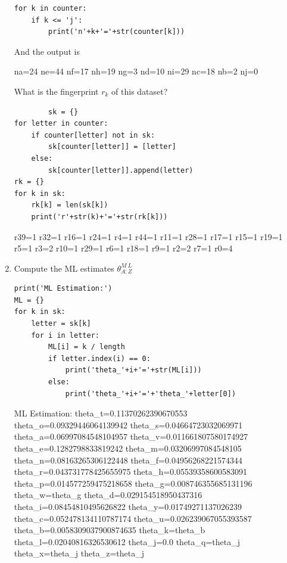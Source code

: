 \documentclass[preprint,12pt]{elsarticle}
\begin{document}
\begin{enumerate}
\begin{lstlisting}
for k in counter:
    if k <= 'j':
        print('n'+k+'='+str(counter[k]))
    \end{lstlisting}
    And the output is 
    \begin{spverbatim}
    na=24
    ne=44
    nf=17
    nh=19
    ng=3
    nd=10
    ni=29
    nc=18
    nb=2
    nj=0
    \end{spverbatim}
    What is the fingerprint $r_k$ of this dataset?
    \begin{lstlisting}
        sk = {}
for letter in counter:
    if counter[letter] not in sk:
        sk[counter[letter]] = [letter]
    else:
        sk[counter[letter]].append(letter)
rk = {}
for k in sk:
    rk[k] = len(sk[k])
    print('r'+str(k)+'='+str(rk[k]))
    \end{lstlisting}
    \begin{spverbatim}
    r39=1
    r32=1
    r16=1
    r24=1
    r4=1
    r44=1
    r11=1
    r28=1
    r17=1
    r15=1
    r19=1
    r5=1
    r3=2
    r10=1
    r29=1
    r6=1
    r18=1
    r9=1
    r2=2
    r7=1
    r0=4
    \end{spverbatim}
    \item Compute the ML estimates $\theta_{A:Z}^{M\ L}$
    \begin{lstlisting}
print('ML Estimation:')
ML = {}
for k in sk:
    letter = sk[k]
    for i in letter:
        ML[i] = k / length
        if letter.index(i) == 0:
            print('theta_'+i+'='+str(ML[i]))
        else:
            print('theta_'+i+'='+'theta_'+letter[0])
    \end{lstlisting}
    \begin{spverbatim}
    ML Estimation:
    theta_t=0.11370262390670553
    theta_o=0.09329446064139942
    theta_s=0.04664723032069971
    theta_a=0.06997084548104957
    theta_v=0.011661807580174927
    theta_e=0.1282798833819242
    theta_m=0.03206997084548105
    theta_n=0.08163265306122448
    theta_f=0.04956268221574344
    theta_r=0.043731778425655975
    theta_h=0.05539358600583091
    theta_p=0.014577259475218658
    theta_g=0.008746355685131196
    theta_w=theta_g
    theta_d=0.029154518950437316
    theta_i=0.08454810495626822
    theta_y=0.01749271137026239
    theta_c=0.052478134110787174
    theta_u=0.026239067055393587
    theta_b=0.0058309037900874635
    theta_k=theta_b
    theta_l=0.02040816326530612
    theta_j=0.0
    theta_q=theta_j
    theta_x=theta_j
    theta_z=theta_j     
    \end{spverbatim}
        

\end{enumerate}
\end{document}
